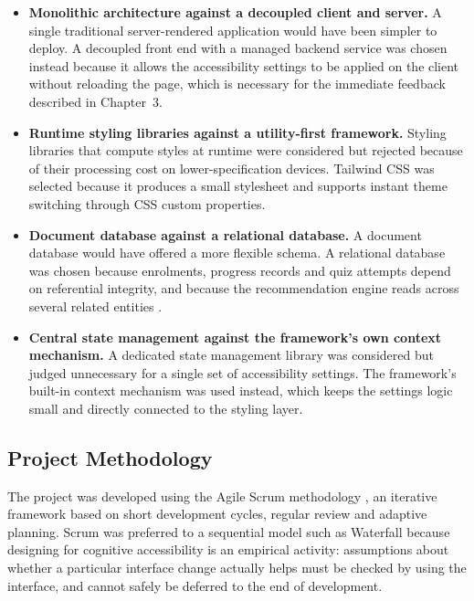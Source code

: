 \documentclass[12pt, oneside]{article} %
\begin{document}
\begin{itemize}
    \item \textbf{Monolithic architecture against a decoupled client and server.} A single traditional server-rendered application would have been simpler to deploy. A decoupled front end \cite{nextjs_ssr} with a managed backend service \cite{supabase_docs} was chosen instead because it allows the accessibility settings to be applied on the client without reloading the page, which is necessary for the immediate feedback described in Chapter~3.
    \item \textbf{Runtime styling libraries against a utility-first framework.} Styling libraries that compute styles at runtime were considered but rejected because of their processing cost on lower-specification devices. Tailwind CSS \cite{tailwind_docs} was selected because it produces a small stylesheet and supports instant theme switching through CSS custom properties.
    \item \textbf{Document database against a relational database.} A document database would have offered a more flexible schema. A relational database was chosen because enrolments, progress records and quiz attempts depend on referential integrity, and because the recommendation engine reads across several related entities \cite{supabase_rls}.
    \item \textbf{Central state management against the framework's own context mechanism.} A dedicated state management library was considered but judged unnecessary for a single set of accessibility settings. The framework's built-in context mechanism \cite{react_docs} was used instead, which keeps the settings logic small and directly connected to the styling layer.
\end{itemize}

\subsection{Project Methodology}

The project was developed using the Agile Scrum methodology \cite{schwaber1995scrum}, an iterative framework based on short development cycles, regular review and adaptive planning. Scrum was preferred to a sequential model such as Waterfall because designing for cognitive accessibility is an empirical activity: assumptions about whether a particular interface change actually helps must be checked by using the interface, and cannot safely be deferred to the end of development.
\end{document}
